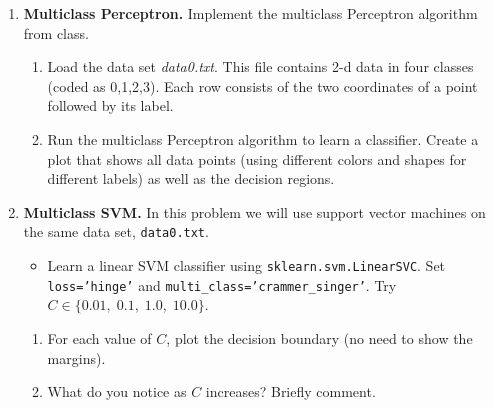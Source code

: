 \documentclass{article}
\begin{document}
\begin{enumerate}[label=\textbf{\arabic*.}]
\item \textbf{Multiclass Perceptron.}
      Implement the multiclass Perceptron algorithm from class.
      \begin{enumerate}[label=(\alph*)]
      \item Load the data set \textit{data0.txt}.  This file contains
            2-d data in four classes (coded as 0,1,2,3).  Each row
            consists of the two coordinates of a point followed by its label.
      \item Run the multiclass Perceptron algorithm to learn a classifier.
            Create a plot that shows all data points (using different
            colors and shapes for different labels) as well as the
            decision regions.
      \end{enumerate}

\item \textbf{Multiclass SVM.}
      In this problem we will use support vector machines on the same
      data set, \texttt{data0.txt}.
      \begin{itemize}
      \item Learn a linear SVM classifier using \texttt{sklearn.svm.LinearSVC}.
            Set \texttt{loss='hinge'} and
            \texttt{multi\_class='crammer\_singer'}.  Try
            $C \in \{0.01,\;0.1,\;1.0,\;10.0\}$.
      \end{itemize}
      \begin{enumerate}[label=(\alph*)]
      \item For each value of $C$, plot the decision boundary (no need to
            show the margins).
      \item What do you notice as $C$ increases?  Briefly comment.
      \end{enumerate}
\end{enumerate}
\end{document}

